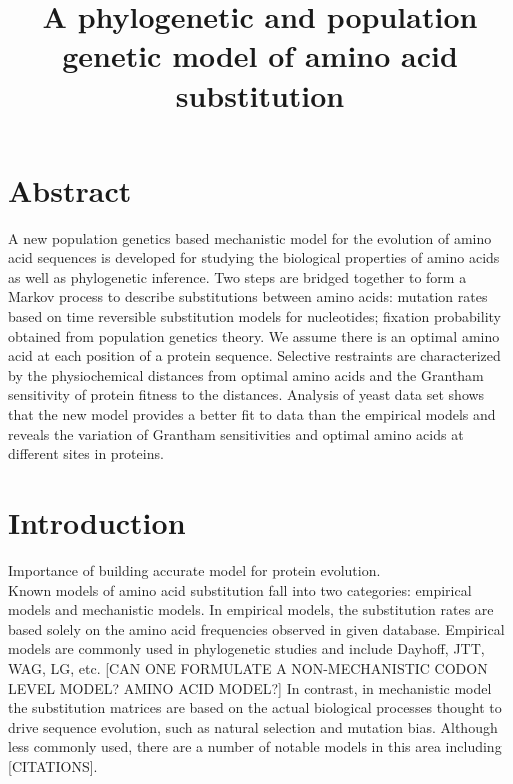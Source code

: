 \documentclass[13pt]{article}
\title{A phylogenetic and population genetic model of amino acid substitution}
\author{}
\begin{document}
\maketitle
\section{Abstract}
A new population genetics based mechanistic model for the evolution of amino acid sequences is developed for studying the biological properties of amino acids as well as phylogenetic inference.
Two steps are bridged together to form a Markov process to describe substitutions between amino acids: mutation rates based on time reversible substitution models for nucleotides; fixation probability obtained from population genetics theory. 
We assume there is an optimal amino acid at each position of a protein sequence. 
Selective restraints are characterized by the physiochemical distances from optimal amino acids and the Grantham sensitivity of protein fitness to the distances. 
Analysis of yeast data set shows that the new model provides a better fit to data than the empirical models and reveals the variation of Grantham sensitivities and optimal amino acids at different sites in proteins.\\

\section{Introduction}
Importance of building accurate model for protein evolution. \\

Known models of amino acid substitution fall into two categories: empirical models and mechanistic models. 
In empirical models, the substitution rates are based solely on the amino acid frequencies observed in given database.
Empirical models are commonly used in phylogenetic studies and include  Dayhoff, JTT, WAG, LG, etc. 
[CAN ONE FORMULATE A NON-MECHANISTIC CODON LEVEL MODEL? AMINO ACID MODEL?]
In contrast, in mechanistic model the substitution matrices are based on the actual biological processes thought to drive sequence evolution, such as natural selection and mutation bias.
Although less commonly used, there are a number of notable models in this area including [CITATIONS].
\end{document}
